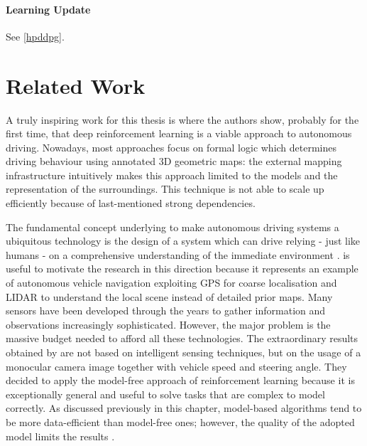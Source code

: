 \paragraph{Learning Update} See \vref{hpddpg}.


\section{Related Work} \label{sec:related-work}


A truly inspiring work for this thesis is \cite{kendall2019learning} where the authors show, probably for the first time, that deep reinforcement learning is a viable approach to autonomous driving.
Nowadays,  most approaches focus on formal logic which determines driving behaviour using annotated 3D geometric maps: the external mapping infrastructure intuitively makes this approach limited to the models and the representation of the surroundings.
This technique is not able to scale up efficiently because of last-mentioned strong dependencies.

The fundamental concept underlying \cite{kendall2019learning} to make autonomous driving systems a ubiquitous technology is the design of a system which can drive relying - just like humans - on a comprehensive understanding of the immediate environment \cite{badrinarayanan2017segnet}.
\cite{ort2018autonomous} is useful to motivate the research in this direction because it represents an example of autonomous vehicle navigation exploiting GPS for coarse localisation and LIDAR to understand the local scene instead of detailed prior maps.
Many sensors have been developed through the years to gather information and observations increasingly sophisticated.
However, the major problem is the massive budget needed to afford all these technologies.
The extraordinary results obtained by \cite{kendall2019learning} are not based on intelligent sensing techniques, but on the usage of a monocular camera image together with vehicle speed and steering angle.
They decided to apply the model-free approach of reinforcement learning because it is exceptionally general and useful to solve tasks that are complex to model correctly.
As discussed previously in this chapter, model-based algorithms tend to be more data-efficient than model-free ones; however, the quality of the adopted model limits the results \cite{deisenroth2011pilco}.

